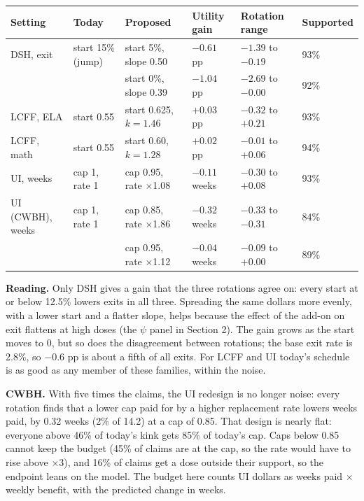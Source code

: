 \documentclass[10pt]{article}
\begin{document}
\begin{center}\small
\begin{tabular}{llllll}
\toprule
Setting & Today & Proposed & Utility gain & Rotation range & Supported\\
\midrule
DSH, exit & start 15\% (jump) & start 5\%, slope 0.50 & $-0.61$ pp & $-1.39$ to $-0.19$ & 93\%\\
 & & start 0\%, slope 0.39 & $-1.04$ pp & $-2.69$ to $-0.00$ & 92\%\\
LCFF, ELA & start 0.55 & start 0.625, $k=1.46$ & $+0.03$ pp & $-0.32$ to $+0.21$ & 93\%\\
LCFF, math & start 0.55 & start 0.60, $k=1.28$ & $+0.02$ pp & $-0.01$ to $+0.06$ & 94\%\\
UI, weeks & cap 1, rate 1 & cap 0.95, rate $\times$1.08 & $-0.11$ weeks & $-0.30$ to $+0.08$ & 93\%\\
UI (CWBH), weeks & cap 1, rate 1 & cap 0.85, rate $\times$1.86 & $-0.32$ weeks & $-0.33$ to $-0.31$ & 84\%\\
 & & cap 0.95, rate $\times$1.12 & $-0.04$ weeks & $-0.09$ to $+0.00$ & 89\%\\
\bottomrule
\end{tabular}
\end{center}

\textbf{Reading.} Only DSH gives a gain that the three rotations agree on: every start at or
below 12.5\% lowers exits in all three. Spreading the same dollars more evenly, with a lower start and
a flatter slope, helps because the effect of the add-on on exit flattens at high doses (the
$\psi$ panel in Section 2). The gain grows as the start moves to 0, but so does the
disagreement between rotations; the base exit rate is 2.8\%, so $-0.6$ pp is about a fifth of
all exits. For LCFF and UI today's schedule is as good as any member of these families,
within the noise.

\textbf{CWBH.} With five times the claims, the UI redesign is no longer noise: every rotation
finds that a lower cap paid for by a higher replacement rate lowers weeks paid, by 0.32 weeks
(2\% of 14.2) at a cap of 0.85. That design is nearly flat: everyone above 46\% of today's
kink gets 85\% of today's cap. Caps below 0.85 cannot keep the budget (45\% of claims are at
the cap, so the rate would have to rise above $\times$3), and 16\% of claims get a dose
outside their support, so the endpoint leans on the model. The budget here counts UI dollars
as weeks paid $\times$ weekly benefit, with the predicted change in weeks.
\end{document}
